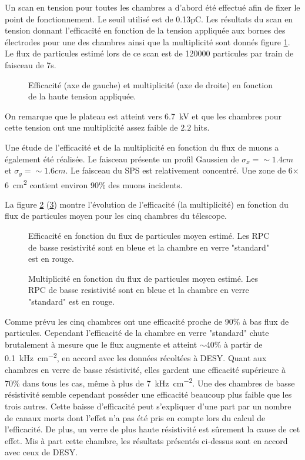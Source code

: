 Un scan en tension pour toutes les chambres a d'abord été effectué afin de fixer le point de fonctionnement. Le seuil utilisé est de 0.13pC. Les résultats du scan en tension donnant l’efficacité en fonction de la tension appliquée aux bornes des électrodes pour une des chambres ainsi que la multiplicité sont donnés figure \ref{HVSPS}. Le flux de particules estimé lors de ce scan est de \num{120000} particules par train de faisceau de 7s.

\begin{figure}[!ht]
	\centering
	\scalebox{1.3}{}
	\caption{Efficacité (axe de gauche) et multiplicité (axe de droite) en fonction de la haute tension appliquée.}
	\label{HVSPS}
\end{figure}

On remarque que le plateau est atteint vers \SI{6.7}{\kilo\volt} et que les chambres pour cette tension ont une multiplicité assez faible de $2.2$ hits. 

Une étude de l'efficacité et de la multiplicité en fonction du flux de muons a également été réalisée. Le faisceau présente un profil Gaussien de $\sigma_{x}=\sim 1.4cm$ et $\sigma_{y}=\sim 1.6cm$. Le faisceau du SPS est relativement concentré. Une zone de \num{6}$\times$\SI{6}{\square\centi\meter} contient environ 90\% des muons incidents.

La figure \ref{RateSPS} (\ref{MultiplictySPS}) montre l'évolution de l'efficacité (la multiplicité) en fonction du flux de particules moyen pour les cinq chambres du télescope.

\begin{figure}[!ht]
	\centering
	\scalebox{1.3}{}
	\caption{Efficacité en fonction du flux de particules moyen estimé. Les RPC de basse resistivité sont en bleue et la chambre en verre "standard" est en rouge.}
	\label{RateSPS}
\end{figure}

\begin{figure}[!ht]
	\centering
	\scalebox{1.315}{}
	\caption{Multiplicité en fonction du flux de particules moyen estimé. Les RPC de basse resistivité sont en bleue et la chambre en verre "standard" est en rouge.}
	\label{MultiplictySPS}
\end{figure}

Comme prévu les cinq chambres ont une efficacité proche de 90\% à bas flux de particules. Cependant l'efficacité de  la chambre en verre "standard" chute brutalement à mesure que le flux augmente et atteint $\sim $40\% à partir de \SI{0.1}{\kilo\hertz\per\square\centi\meter}, en accord avec les données récoltées à DESY. Quant aux chambres en verre de basse résistivité, elles gardent une efficacité supérieure à 70\% dans tous les cas, même à plus de \SI{7}{\kilo\hertz\per\square\centi\meter}. Une des chambres de basse résistivité semble cependant posséder une efficacité beaucoup plus faible que les trois autres. Cette baisse d'efficacité peut s'expliquer d'une part par un nombre de canaux morts dont l'effet n'a pas été pris en compte lors du calcul de l'efficacité. De plus, un verre de plus haute résistivité est sûrement la cause de cet effet. Mis à part cette chambre, les résultats présentés ci-dessus sont en accord avec ceux de DESY.


